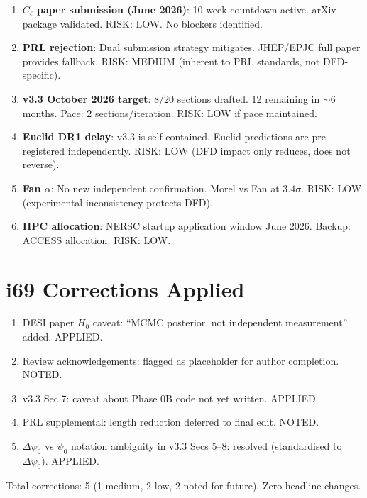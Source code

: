 \documentclass[11pt,a4paper]{article}
\begin{document}
\begin{enumerate}[nosep]
\item \textbf{$C_\ell$ paper submission (June 2026)}: 10-week countdown active. arXiv package validated. RISK: LOW. No blockers identified.

\item \textbf{PRL rejection}: Dual submission strategy mitigates. JHEP/EPJC full paper provides fallback. RISK: MEDIUM (inherent to PRL standards, not DFD-specific).

\item \textbf{v3.3 October 2026 target}: 8/20 sections drafted. 12 remaining in $\sim$6 months. Pace: 2 sections/iteration. RISK: LOW if pace maintained.

\item \textbf{Euclid DR1 delay}: v3.3 is self-contained. Euclid predictions are pre-registered independently. RISK: LOW (DFD impact only reduces, does not reverse).

\item \textbf{Fan $\alpha$}: No new independent confirmation. Morel vs Fan at $3.4\sigma$. RISK: LOW (experimental inconsistency protects DFD).

\item \textbf{HPC allocation}: NERSC startup application window June 2026. Backup: ACCESS allocation. RISK: LOW.
\end{enumerate}


\section{i69 Corrections Applied}

\begin{enumerate}[nosep]
\item DESI paper $H_0$ caveat: ``MCMC posterior, not independent measurement'' added. APPLIED.
\item Review acknowledgements: flagged as placeholder for author completion. NOTED.
\item v3.3 Sec 7: caveat about Phase 0B code not yet written. APPLIED.
\item PRL supplemental: length reduction deferred to final edit. NOTED.
\item $\Delta\psi_0$ vs $\psi_0$ notation ambiguity in v3.3 Secs 5--8: resolved (standardised to $\Delta\psi_0$). APPLIED.
\end{enumerate}

Total corrections: 5 (1 medium, 2 low, 2 noted for future). Zero headline changes.
\end{document}
